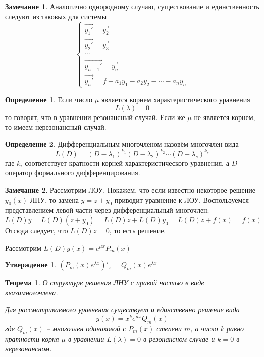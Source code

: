 \documentclass[a4paper,12pt]{article}
\theoremstyle{plain}
\newtheorem{theorem}{Теорема}[section]
\newtheorem{proposition}{Утверждение}[section]
\theoremstyle{definition}
\newtheorem{definition}{Определение}[section]
\newtheorem*{note}{Замечание}
\theoremstyle{remark}
\begin{document}
\begin{note}
	Аналогично однородному случаю, существование и единственность следуют из таковых для системы
	\[\begin{cases}
			\vec{y_1'} = \vec{y_2}     \\
			\vec{y_2'} = \vec{y_3}     \\
			\cdots                     \\
			\vec{y_{n-1}'} = \vec{y_n} \\
			\vec{y_n'} = f - a_1y_1 - a_2y_2 - \cdots - a_ny_n
		\end{cases}\]
\end{note}

\begin{definition}
	Если число $\mu$ является корнем характеристического уравнения
	\[L(\lambda) = 0\]
	то говорят, что в уравнении резонансный случай. Если же $\mu$ не является корнем, то имеем нерезонансный случай.
\end{definition}

\begin{definition}
	Дифференциальным многочленом назовём многочлен вида
	\[L(D) = (D - \lambda_1)^{k_1}(D - \lambda_2)^{k_2}\cdots(D - \lambda_s)^{k_s}\]
	где $k_i$ соответствует кратности корней характеристического уравнения, а $D$ -- оператор формального дифференцирования.
\end{definition}

\begin{note}
	Рассмотрим ЛОУ. Покажем, что если известно некоторое решение $y_0(x)$ ЛНУ, то замена $y = z + y_0$ приводит уравнение к ЛОУ. Воспользуемся представлением левой части через дифференциальный многочлен:
	\[L(D)y = L(D)(z + y_0) = L(D)z + L(D)y_0 = L(D)z + f(x) = f(x)\]
	Отсюда следует, что $L(D)z = 0$, то есть решение.
\end{note}

Рассмотрим $L(D)y(x) = e^{\mu x}P_m(x)$
\begin{proposition}
	$(P_m(x)e^{\lambda x})'_x = Q_m(x)e^{\lambda x}$
\end{proposition}

\begin{theorem}
	О структуре решения ЛНУ с правой частью в виде квазимногочлена.

	Для рассматриваемого уравнения существует и единственно решение вида
	\[y(x) = x^ke^{\mu x}Q_m(x)\]
	где $Q_m(x)$ -- многочлен одинаковой с $P_m(x)$ степени $m$, а число $k$ равно кратности корня $\mu$ в уравнении $L(\lambda) = 0$ в резонансном случае и $k = 0$ в нерезонансном.
\end{theorem}
\end{document}

